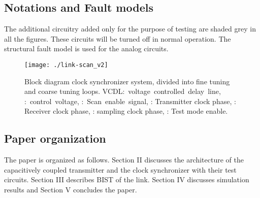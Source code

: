 \documentclass[conference]{IEEEtran}
\begin{document}
\subsection{Notations and Fault models}
The additional circuitry added only for the purpose of testing are shaded
grey in all the figures. These circuits will be turned off in normal operation.
The structural fault model \cite{bist-pll-tcas2-01} is used 
for the analog circuits.
\begin{figure*}[t!]
\centering
{}
\texttt{[image: ./link-scan\_v2]}
\caption{Block diagram clock synchronizer system, divided
into fine tuning and coarse tuning loops.
\mbox{VCDL: voltage controlled delay line},
\mbox{: control voltage}, \mbox{: Scan enable signal},
: Transmitter clock phase,
: Receiver clock phase,
: sampling clock phase,
: Test mode enable.}
\label{fig:link-scan}
\end{figure*}


\subsection{Paper organization}
The paper is organized as follows. Section II discusses the 
architecture of the capacitively coupled transmitter and the clock 
synchronizer with their test circuits. Section III
describes BIST of the link. Section IV discusses simulation
results and Section V concludes the paper.
\end{document}
